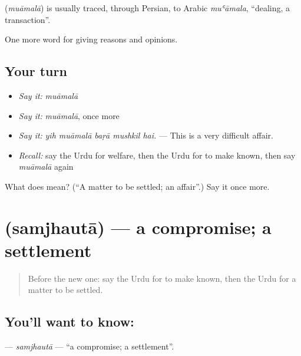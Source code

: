 \begin{cousinweb}
\textbf{} (\emph{muāmalā}) is usually traced, through Persian, to Arabic \emph{muʿāmala}, \textquotedblleft{}dealing, a transaction\textquotedblright{}.
\end{cousinweb}

\begin{grammarlens}[title={What you've built}]
One more word for giving reasons and opinions.
\end{grammarlens}

\subsection*{Your turn}
\begin{itemize}
\raggedright
  \item \emph{Say it:} \emph{muāmalā}
  \item \emph{Say it:} \emph{muāmalā}, once more
  \item \emph{Say it:} \emph{yih muāmalā baṛā mushkil hai.} — This is a very difficult affair.
  \item \emph{Recall:} say the Urdu for welfare, then the Urdu for to make known, then say \emph{muāmalā} again
\end{itemize}

\begin{tcolorbox}[breakable,colback=teal!4,colframe=teal!35!black,title={Before you move on}]
What does  mean? (\textquotedblleft{}A matter to be settled; an affair\textquotedblright{}.) Say it once more.
\end{tcolorbox}
\section[\texorpdfstring{\ur{سمجھوتا} (samjhautā)}{سمجھوتا (samjhautā)}]{ (samjhautā) — a compromise; a settlement}

\label{lesson:UR-C347-samjhauta}



\begin{quote}
Before the new one: say the Urdu for to make known, then the Urdu for a matter to be settled.
\end{quote}

\subsection*{You'll want to know: }
\textbf{} — \emph{samjhautā} — \textquotedblleft{}a compromise; a settlement\textquotedblright{}.

